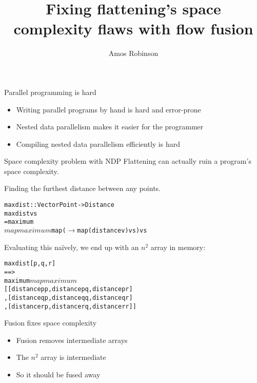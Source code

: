 \documentclass[t]{beamer}
\newcommand{\bs}{\symbol{`\\}}
\newcommand{\arr}{$\rightarrow$}
\newcommand{\lam}[1]{\bs{}{#1} \arr }
\begin{document}
\title{Fixing flattening's space complexity flaws with flow fusion}
\author{Amos Robinson}

\frame{\titlepage}

\begin{frame}[fragile]{Parallel programming is hard}

\begin{itemize}
\item Writing parallel programs by hand is hard and error-prone
\item Nested data parallelism makes it easier for the programmer
\item Compiling nested data parallelism efficiently is hard
\end{itemize}

\end{frame}

\begin{frame}[fragile]{Space complexity problem with NDP}
Flattening can actually ruin a program's space complexity.

Finding the furthest distance between any points.
\begin{alltt}
maxdist :: Vector Point -> Distance
maxdist vs
 = maximum
 $ map maximum
 $ map (\lam{v} map (distance v) vs) vs
\end{alltt}

Evaluating this na\"{i}vely, we end up with an $n^2$ array in memory:
\begin{alltt}
maxdist [p, q, r]
==>
maximum $ map maximum $
[ [distance p p, distance p q, distance p r]
, [distance q p, distance q q, distance q r]
, [distance r p, distance r q, distance r r]]
\end{alltt}

\end{frame}

\begin{frame}[fragile]{Fusion fixes space complexity}

\begin{itemize}
\item Fusion removes intermediate arrays
\item The $n^2$ array is intermediate
\item So it should be fused away
\end{itemize}

\end{frame}
\end{document}
